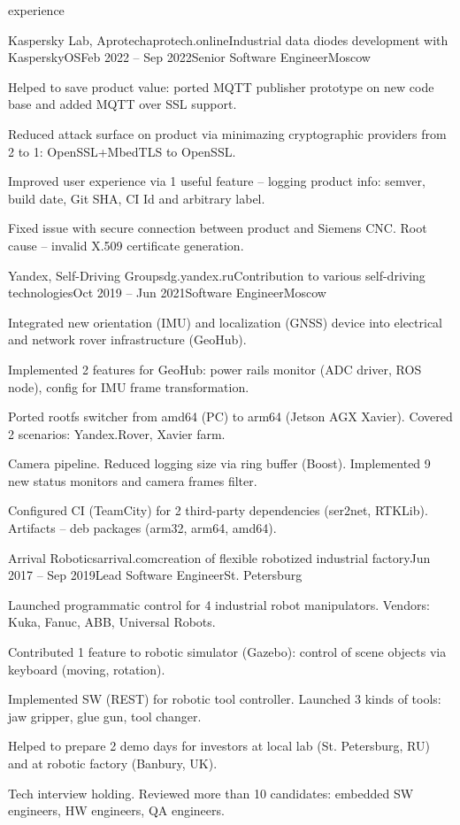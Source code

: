 \documentclass{Vladimir.Ivanov.CV}
\begin{document}
\begin{rSection}{experience}
\begin{rCompany}{Kaspersky Lab, Aprotech}{aprotech.online}{Industrial data diodes development with KasperskyOS}{Feb 2022 -- Sep 2022}{Senior Software Engineer}{Moscow}

\item Helped to save product value: ported MQTT publisher prototype on new code base and added MQTT over SSL support.
\item Reduced attack surface on product via minimazing cryptographic providers from 2 to 1: OpenSSL+MbedTLS to OpenSSL.
\item Improved user experience via 1 useful feature -- logging product info: semver, build date, Git SHA, CI Id and arbitrary label.
\item Fixed issue with secure connection between product and Siemens CNC. Root cause -- invalid X.509 certificate generation.

\end{rCompany}
\begin{rCompany}{Yandex, Self-Driving Group}{sdg.yandex.ru}{Contribution to various self-driving technologies}{Oct 2019 -- Jun 2021}{Software Engineer}{Moscow}

\item Integrated new orientation (IMU) and localization (GNSS) device into electrical and network rover infrastructure (GeoHub).
\item Implemented 2 features for GeoHub: power rails monitor (ADC driver, ROS node), config for IMU frame transformation.
\item Ported rootfs switcher from amd64 (PC) to arm64 (Jetson AGX Xavier). Covered 2 scenarios: Yandex.Rover, Xavier farm.
\item Camera pipeline. Reduced logging size via ring buffer (Boost). Implemented 9 new status monitors and camera frames filter.
\item Configured CI (TeamCity) for 2 third-party dependencies (ser2net, RTKLib). Artifacts -- deb packages (arm32, arm64, amd64).

\end{rCompany}
\begin{rCompany}{Arrival Robotics}{arrival.com}{creation of flexible robotized industrial factory}{Jun 2017 -- Sep 2019}{Lead Software Engineer}{St. Petersburg}

\item Launched programmatic control for 4 industrial robot manipulators. Vendors: Kuka, Fanuc, ABB, Universal Robots.
\item Contributed 1 feature to robotic simulator (Gazebo): control of scene objects via keyboard (moving, rotation).
\item Implemented SW (REST) for robotic tool controller. Launched 3 kinds of tools: jaw gripper, glue gun, tool changer.
\item Helped to prepare 2 demo days for investors at local lab (St. Petersburg, RU) and at robotic factory (Banbury, UK).
\item Tech interview holding. Reviewed more than 10 candidates: embedded SW engineers, HW engineers, QA engineers.


\end{rCompany}
\end{rSection}
\end{document}
